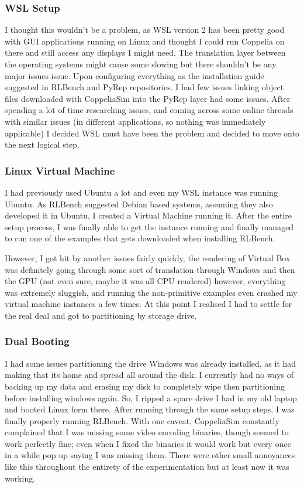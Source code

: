 \subsubsection{WSL Setup}
I thought this wouldn't be a problem, as WSL version 2 has been pretty good with GUI applications running on Linux and thought I could run Coppelia on there and still access any displays I might need. The translation layer between the operating systems might cause some slowing but there shouldn't be any major issues issue. Upon configuring everything as the installation guide suggested in RLBench and PyRep repositories. I had few issues linking object files downloaded with CoppeliaSim into the PyRep layer had some issues. After spending a lot of time researching issues, and coming across some online threads with similar issues (in different applications, so nothing was immediately applicable) I decided WSL must have been the problem and decided to move onto the next logical step.
 
\subsubsection{Linux Virtual Machine}
I had previously used Ubuntu a lot and even my WSL instance was running Ubuntu. As RLBench suggested Debian based systems, assuming they also developed it in Ubuntu, I created a Virtual Machine running it. After the entire setup process, I was finally able to get the instance running and finally managed to run one of the examples that gets downloaded when installing RLBench.

However, I got hit by another issues fairly quickly, the rendering of Virtual Box was definitely going through some sort of translation through Windows and then the GPU (not even sure, maybe it was all CPU rendered) however, everything was extremely sluggish, and running the non-primitive examples even crashed my virtual machine instances a few times. At this point I realised I had to settle for the real deal and got to partitioning by storage drive.

\subsubsection{Dual Booting}
I had some issues partitioning the drive Windows was already installed, as it had making that its home and spread all around the disk. I currently had no ways of backing up my data and erasing my disk to completely wipe then partitioning before installing windows again. So, I ripped a spare drive I had in my old laptop and booted Linux form there. After running through the same setup steps, I was finally properly running RLBench. With one caveat, CoppeliaSim constantly complained that I was missing some video encoding binaries, though seemed to work perfectly fine; even when I fixed the binaries it would work but every once in a while pop up saying I was missing them. There were other small annoyances like this throughout the entirety of the experimentation but at least now it was working.

